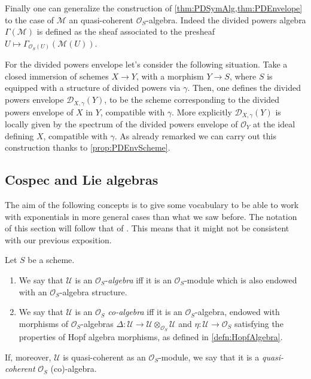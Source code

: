 \begin{rem}[]
	Finally one can generalize the construction
	of \cref{thm:PDSymAlg,thm:PDEnvelope} to the case of $\mathcal{M}$
	an quasi-coherent $\mathcal{O}_{ S }$-algebra.
	Indeed the divided powers algebra $\Gamma(\mathcal{M})$ is defined
	as the sheaf associated to the presheaf 
	$U \mapsto \Gamma_{\mathcal{O}_S(U)}(\mathcal{M}(U))$.

	For the divided powers envelope let's consider the following situation.
	Take a closed immersion of schemes $X \to Y$, with a morphism $Y \to S$,
	where $S$ is equipped with a structure of divided powers via $\gamma$.
	Then, one defines the
	divided powers envelope $\mathcal{D}_{X,\gamma}(Y)$, to be the scheme
	corresponding to the divided powers envelope of $X$ in $Y$,
	compatible with $\gamma$.
	More explicitly $\mathcal{D}_{X,\gamma}(Y)$ is locally 
	given by the spectrum of the divided powers envelope
	of $\mathcal{O}_{ Y }$ at the ideal defining $X$, compatible with $\gamma$.
	As already remarked we can carry out this construction
	thanks to \cref{prop:PDEnvScheme}.
\end{rem}


\subsection{Cospec and Lie algebras}
The aim of the following concepts is to give some vocabulary to
be able to work with exponentials in more general cases than what we saw before.
The notation of this section will follow that of \cite[Capther III]{Messing}.
This means that it might not be consistent with our previous exposition.


\begin{defn}
	Let $S$ be a scheme.
\begin{enumerate}
\item We say that $\mathcal{U}$ is an $\mathcal{O}_{ S }$-{\em algebra}
	iff it is an $\mathcal{O}_{ S }$-module
	which is also endowed with an $\mathcal{O}_{ S }$-algebra structure.
\item We say that $\mathcal{U}$ is an $\mathcal{O}_{ S }$ {\em co-algebra}
	iff it is an $\mathcal{O}_{ S }$-algebra, endowed with
	morphisms of $\mathcal{O}_S$-algebras
	$\Delta\colon \mathcal{U} \to \mathcal{U} \otimes_{\mathcal{O}_{ S }} \mathcal{U}$
	and $\eta\colon \mathcal{U} \to \mathcal{O}_{ S }$
	satisfying the properties of Hopf algebra morphisms,
	as defined in \cref{defn:HopfAlgebra}.
\end{enumerate}
	If, moreover, $\mathcal{U}$ is quasi-coherent as an $\mathcal{O}_{ S }$-module,
	we say that it is a {\em quasi-coherent} $\mathcal{O}_{ S }$ (co)-algebra.
\end{defn}


